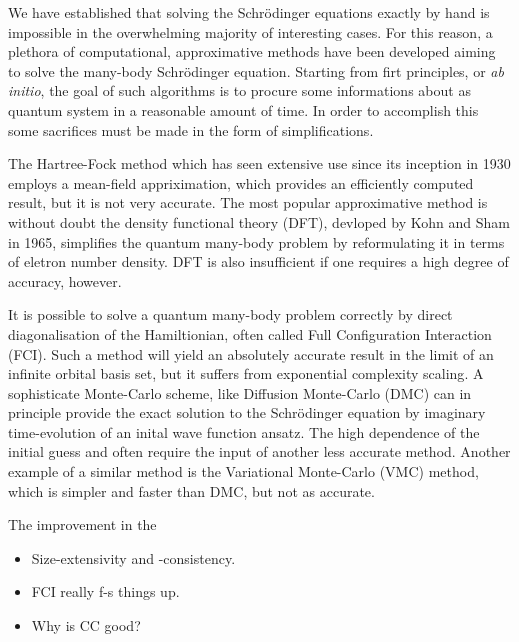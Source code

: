     We have established that solving the Schrödinger equations exactly by hand is 
    impossible in the overwhelming majority of interesting cases. For this reason, 
    a plethora of computational, approximative methods have been developed aiming 
    to solve the many-body Schrödinger equation. Starting from firt principles,
    or \emph{ab initio}, the goal of such algorithms is to procure some informations 
    about as quantum system in a reasonable amount of time. In order to accomplish 
    this some sacrifices must be made in the form of simplifications. 

    The Hartree-Fock
    method\cite{hartree1928wave,fock1930naherungsmethode,szabo2012modern} which 
    has seen extensive use since its inception in 1930
    employs a mean-field appriximation, which provides an efficiently computed result, 
    but it is not very accurate. The most popular approximative method is without doubt 
    the density functional theory (DFT), devloped by Kohn and Sham in
    1965\cite{kohn1965self}, simplifies the quantum many-body problem by reformulating 
    it in terms of eletron number density. DFT is also insufficient if one requires a 
    high degree of accuracy, however.

    It is possible to solve a quantum many-body problem correctly by direct diagonalisation 
    of the Hamiltionian, often called Full Configuration Interaction (FCI). Such a method 
    will yield an absolutely accurate result in the limit of an infinite orbital basis set,
    but it suffers from exponential complexity scaling\cite{helgaker2014molecular}.
    A sophisticate Monte-Carlo scheme, like Diffusion Monte-Carlo (DMC) can in principle 
    provide the exact solution to the Schrödinger equation by imaginary time-evolution 
    of an inital wave function ansatz\cite{hammond1994monte}. The high dependence of the 
    initial guess and often require the input of another less accurate method. Another 
    example of a similar method is the Variational Monte-Carlo (VMC) method, which is
    simpler and faster than DMC, but not as accurate.

    The improvement in the 

    \begin{itemize}
        \item Size-extensivity and -consistency.
        \item FCI really f-s things up.
        \item Why is CC good?
    \end{itemize}

